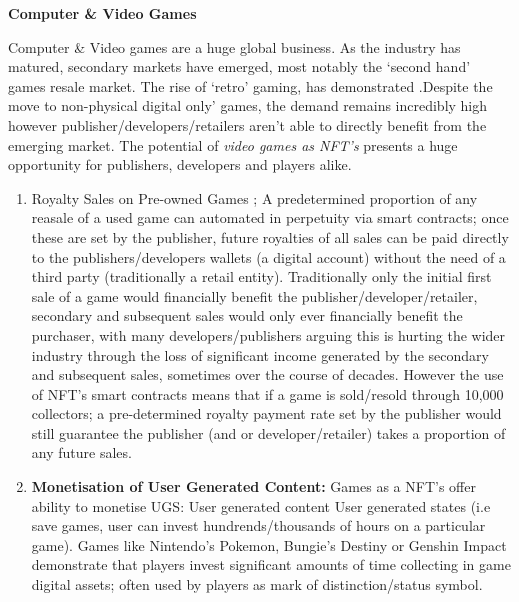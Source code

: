 \textbf{Computer \& Video Games}

Computer \& Video games are a huge global business. As the industry has
matured, secondary markets have emerged, most notably the `second hand'
games resale market. The rise of `retro' gaming, has demonstrated
.Despite the move to non-physical digital only' games, the demand
remains incredibly high however publisher/developers/retailers aren't
able to directly benefit from the emerging market. The potential of
\emph{video games as NFT's} presents a huge opportunity for publishers,
developers and players alike.

\begin{enumerate}
\def\labelenumi{\alph{enumi}.}
\item
  Royalty Sales on Pre-owned Games ; A predetermined proportion of any
  reasale of a used game can automated in perpetuity via smart
  contracts; once these are set by the publisher, future royalties of
  all sales can be paid directly to the publishers/developers wallets (a
  digital account) without the need of a third party (traditionally a
  retail entity). Traditionally only the initial first sale of a game
  would financially benefit the publisher/developer/retailer, secondary
  and subsequent sales would only ever financially benefit the
  purchaser, with many developers/publishers arguing this is hurting the
  wider industry through the loss of significant income generated by the
  secondary and subsequent sales, sometimes over the course of decades.
  However the use of NFT's smart contracts means that if a game is
  sold/resold through 10,000 collectors; a pre-determined royalty
  payment rate set by the publisher would still guarantee the publisher
  (and or developer/retailer) takes a proportion of any future sales.
\item
  \textbf{Monetisation of User Generated Content:} Games as a NFT's
  offer ability to monetise UGS: User generated content User generated
  states (i.e save games, user can invest hundrends/thousands of hours
  on a particular game). Games like Nintendo's Pokemon, Bungie's Destiny
  or Genshin Impact demonstrate that players invest significant amounts
  of time collecting in game digital assets; often used by players as
  mark of distinction/status symbol.
\end{enumerate}

